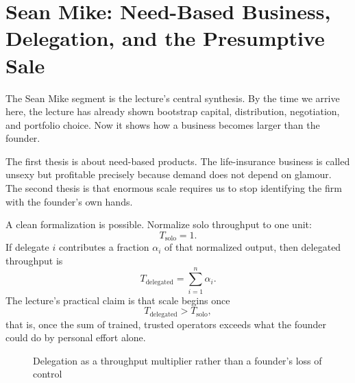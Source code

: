 \section{Sean Mike: Need-Based Business, Delegation, and the Presumptive Sale}

The Sean Mike segment is the lecture's central synthesis. By the time we arrive here, the lecture has already shown bootstrap capital, distribution, negotiation, and portfolio choice. Now it shows how a business becomes larger than the founder.

The first thesis is about need-based products. The life-insurance business is called unsexy but profitable precisely because demand does not depend on glamour. The second thesis is that enormous scale requires us to stop identifying the firm with the founder's own hands.

A clean formalization is possible. Normalize solo throughput to one unit:
\[
T_{\mathrm{solo}}=1.
\]
If delegate \(i\) contributes a fraction \(\alpha_i\) of that normalized output, then delegated throughput is
\begin{equation}
T_{\mathrm{delegated}}=\sum_{i=1}^{n}\alpha_i.
\end{equation}
The lecture's practical claim is that scale begins once
\begin{equation}
T_{\mathrm{delegated}}>T_{\mathrm{solo}},
\end{equation}
that is, once the sum of trained, trusted operators exceeds what the founder could do by personal effort alone.

\begin{figure}[h]
\centering
{}
\caption{Delegation as a throughput multiplier rather than a founder's loss of control}
\end{figure}

